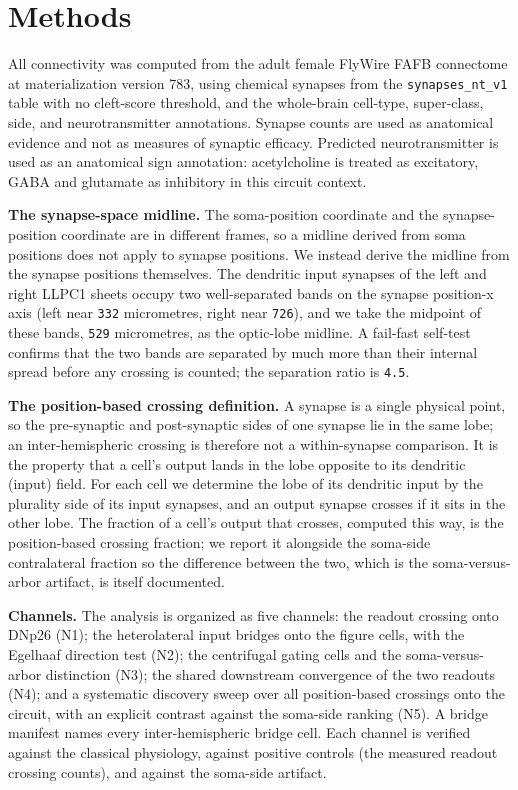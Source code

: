 \documentclass[11pt]{article}
\newcommand{\rid}[1]{\texttt{\small #1}}
\begin{document}
\section{Methods}

All connectivity was computed from the adult female FlyWire FAFB connectome at materialization
version 783, using chemical synapses from the \texttt{synapses\_nt\_v1} table with no cleft-score
threshold, and the whole-brain cell-type, super-class, side, and neurotransmitter annotations.
Synapse counts are used as anatomical evidence and not as measures of synaptic efficacy. Predicted
neurotransmitter is used as an anatomical sign annotation: acetylcholine is treated as excitatory,
GABA and glutamate as inhibitory in this circuit context.

\textbf{The synapse-space midline.} The soma-position coordinate and the synapse-position
coordinate are in different frames, so a midline derived from soma positions does not apply to
synapse positions. We instead derive the midline from the synapse positions themselves. The
dendritic input synapses of the left and right LLPC1 sheets occupy two well-separated bands on the
synapse position-x axis (left near \rid{332} micrometres, right near \rid{726}), and we take the
midpoint of these bands, \rid{529} micrometres, as the optic-lobe midline. A fail-fast self-test
confirms that the two bands are separated by much more than their internal spread before any
crossing is counted; the separation ratio is \rid{4.5}.

\textbf{The position-based crossing definition.} A synapse is a single physical point, so the
pre-synaptic and post-synaptic sides of one synapse lie in the same lobe; an inter-hemispheric
crossing is therefore not a within-synapse comparison. It is the property that a cell's output
lands in the lobe opposite to its dendritic (input) field. For each cell we determine the lobe of
its dendritic input by the plurality side of its input synapses, and an output synapse crosses if
it sits in the other lobe. The fraction of a cell's output that crosses, computed this way, is the
position-based crossing fraction; we report it alongside the soma-side contralateral fraction so
the difference between the two, which is the soma-versus-arbor artifact, is itself documented.

\textbf{Channels.} The analysis is organized as five channels: the readout crossing onto DNp26
(N1); the heterolateral input bridges onto the figure cells, with the Egelhaaf direction test
(N2); the centrifugal gating cells and the soma-versus-arbor distinction (N3); the shared
downstream convergence of the two readouts (N4); and a systematic discovery sweep over all
position-based crossings onto the circuit, with an explicit contrast against the soma-side
ranking (N5). A bridge manifest names every inter-hemispheric bridge cell. Each channel is
verified against the classical physiology, against positive controls (the measured readout
crossing counts), and against the soma-side artifact.
\end{document}
